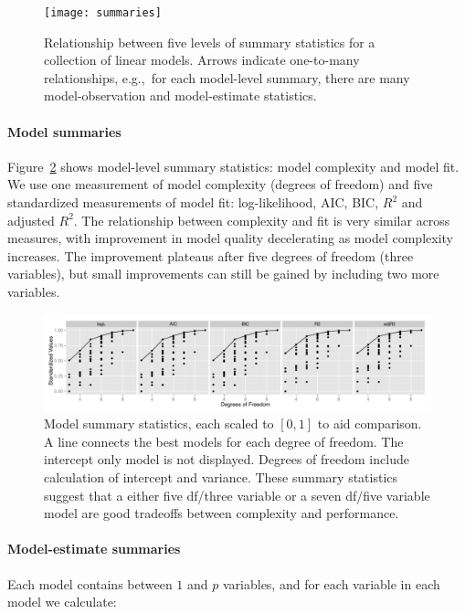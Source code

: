 \documentclass[preprint]{imsart}
\begin{document}
\begin{figure}[htbp]
  \centering
    \texttt{[image: summaries]}
  \caption{Relationship between five levels of summary statistics for a collection of linear models. Arrows indicate one-to-many relationships, e.g.,\ for each model-level summary, there are many model-observation and model-estimate statistics.}
  \label{fig:summaries}
\end{figure}

\paragraph{Model summaries} Figure~\ref{fig:model} shows model-level summary statistics: model complexity and model fit. We use one measurement of model complexity (degrees of freedom) and five standardized measurements of model fit: log-likelihood, AIC, BIC, $R^2$ and adjusted $R^2$. The relationship between complexity and fit is very similar across measures, with improvement in model quality decelerating as model complexity increases. The improvement plateaus after five degrees of freedom (three variables), but small improvements can still be gained by including two more variables.

\begin{figure}[htbp]
	\centering
  \includegraphics[width=\linewidth]{houses-coef-models.pdf}
	\caption{Model summary statistics, each scaled to $[0,1]$ to aid comparison.  A line connects the best models for each degree of freedom.  The intercept only model is not displayed.  Degrees of freedom include calculation of intercept and variance.  These summary statistics suggest that a either five df/three variable or a seven df/five variable model are good tradeoffs between complexity and performance.}
	\label{fig:model}
\end{figure}

\paragraph{Model-estimate summaries} Each model contains between $1$ and $p$ variables, and for each variable in each model we calculate:
\end{document}
